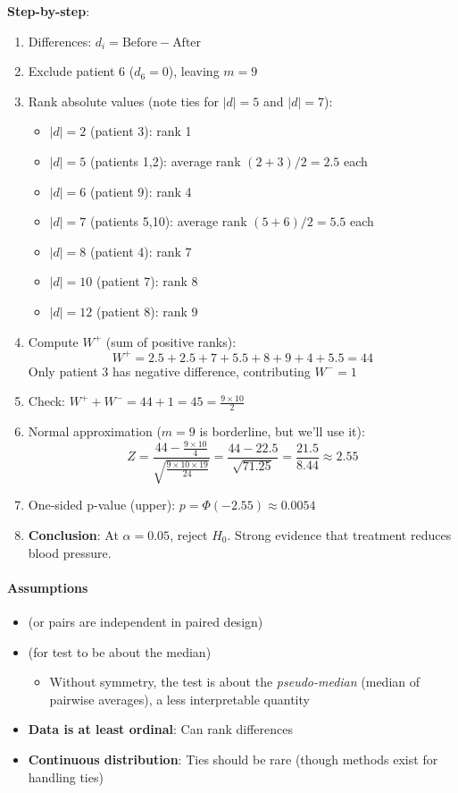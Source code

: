 \textbf{Step-by-step}:
\begin{enumerate}
    \item Differences: $d_i = \text{Before} - \text{After}$
    \item Exclude patient 6 ($d_6 = 0$), leaving $m = 9$
    \item Rank absolute values (note ties for $|d|=5$ and $|d|=7$):
        \begin{itemize}
            \item $|d|=2$ (patient 3): rank 1
            \item $|d|=5$ (patients 1,2): average rank $(2+3)/2 = 2.5$ each
            \item $|d|=6$ (patient 9): rank 4
            \item $|d|=7$ (patients 5,10): average rank $(5+6)/2 = 5.5$ each
            \item $|d|=8$ (patient 4): rank 7
            \item $|d|=10$ (patient 7): rank 8
            \item $|d|=12$ (patient 8): rank 9
        \end{itemize}
    \item Compute $W^+$ (sum of positive ranks):
        $$W^+ = 2.5 + 2.5 + 7 + 5.5 + 8 + 9 + 4 + 5.5 = 44$$
        Only patient 3 has negative difference, contributing $W^- = 1$
    \item Check: $W^+ + W^- = 44 + 1 = 45 = \frac{9 \times 10}{2}$
    \item Normal approximation ($m=9$ is borderline, but we'll use it):
        $$Z = \dfrac{44 - \frac{9 \times 10}{4}}{\sqrt{\frac{9 \times 10 \times 19}{24}}} = \dfrac{44 - 22.5}{\sqrt{71.25}} = \dfrac{21.5}{8.44} \approx 2.55$$
    \item One-sided p-value (upper): $p = \Phi(-2.55) \approx 0.0054$
    \item \textbf{Conclusion}: At $\alpha = 0.05$, reject $H_0$. Strong evidence that treatment
        reduces blood pressure.
\end{enumerate}

\paragraph{Assumptions}
\begin{itemize}
    \item {} (or pairs are independent in paired design)
    \item {} (for test to be about the median)
        \begin{itemize}
            \item Without symmetry, the test is about the \emph{pseudo-median}
                (median of pairwise averages), a less interpretable quantity
        \end{itemize}
    \item \textbf{Data is at least ordinal}: Can rank differences
    \item \textbf{Continuous distribution}: Ties should be rare (though methods exist for handling ties)
\end{itemize}

